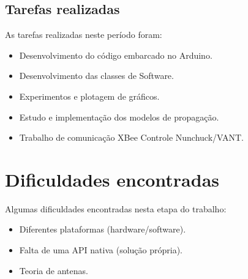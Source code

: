 
%

\subsection*{Tarefas realizadas}\label{tasks}
As tarefas realizadas neste período foram:
\begin{itemize}
	\item Desenvolvimento do código embarcado no Arduino.
	\item Desenvolvimento das classes de Software.
	\item Experimentos e plotagem de gráficos.
	\item Estudo e implementação dos modelos de propagação.
	\item Trabalho de comunicação XBee Controle Nunchuck/VANT.
\end{itemize}

\section{Dificuldades encontradas}\label{diff}

Algumas dificuldades encontradas nesta etapa do trabalho:

\begin{itemize}
\item Diferentes plataformas (hardware/software).
\item Falta de uma API nativa (solução própria).
\item Teoria de antenas.
\end{itemize}

